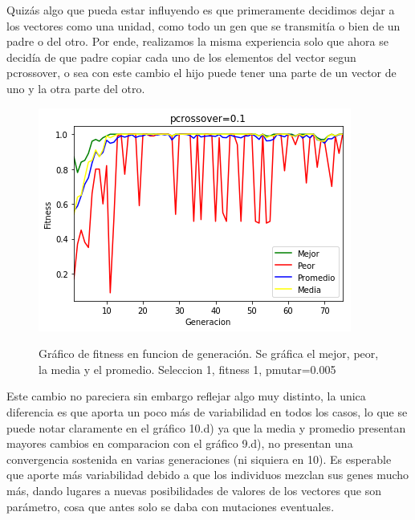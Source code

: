 \documentclass[A4paper,oneside,fleqn,11pt]{article}
\theoremstyle{definition}
\begin{document}
Quizás algo que pueda estar influyendo es que primeramente decidimos dejar a los vectores como una unidad, como todo un gen que se transmitía o bien de un padre o del otro. Por ende, realizamos la misma experiencia solo que ahora se decidía de que padre copiar cada uno de los elementos del vector segun pcrossover, o sea con este cambio el hijo puede tener una parte de un vector de uno y la otra parte del otro.

\begin{figure}[H]
	\captionsetup[subfigure]{position=b}
	\centering
		{\includegraphics[width=0.3\linewidth]{crossoverB1.png}}
	\caption{Gráfico de fitness en funcion de generación. Se gráfica el mejor, peor, la media y el promedio. Seleccion 1, fitness 1, pmutar=0.005}
\end{figure}

Este cambio no pareciera sin embargo reflejar algo muy distinto, la unica diferencia es que aporta un poco más de variabilidad en todos los casos, lo que se puede notar claramente en el gráfico 10.d) ya que la media y promedio presentan mayores cambios en comparacion con el gráfico 9.d), no presentan una convergencia sostenida en varias generaciones (ni siquiera en 10). Es esperable que aporte más variabilidad debido a que los individuos mezclan sus genes mucho más, dando lugares a nuevas posibilidades de valores de los vectores que son parámetro, cosa que antes solo se daba con mutaciones eventuales.
\end{document}
